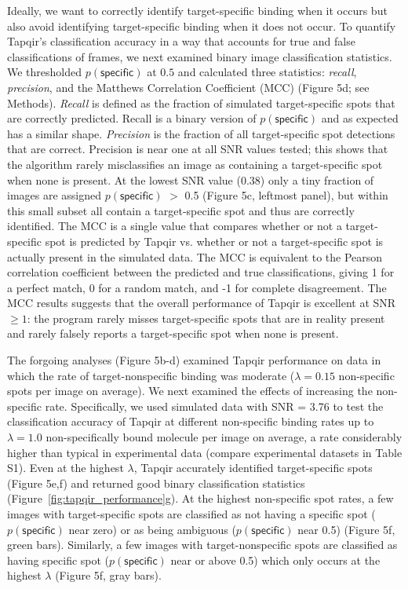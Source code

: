 Ideally, we want to correctly identify target-specific binding when it occurs but also avoid identifying target-specific binding when it does not occur. To quantify Tapqir's classification accuracy in a way that accounts for true and false classifications of frames, we next examined binary image classification statistics. We thresholded $p(\mathsf{specific})$ at $0.5$ and calculated three statistics: \textit{recall}, \textit{precision}, and the Matthews Correlation Coefficient (MCC) \cite{Matthews1975-rw} (Figure 5d; see Methods). \textit{Recall} is defined as the fraction of simulated target-specific spots that are correctly predicted. Recall is a binary version of $p(\mathsf{specific})$ and as expected has a similar shape. \textit{Precision} is the fraction of all target-specific spot detections that are correct. Precision is near one at all SNR values tested; this shows that the algorithm rarely misclassifies an image as containing a target-specific spot when none is present. At the lowest SNR value (0.38) only a tiny fraction of images are assigned $p(\mathsf{specific})$ $>$ 0.5 (Figure 5c, leftmost panel), but within this small subset all contain a target-specific spot and thus are correctly identified. The MCC is a single value that compares whether or not a target-specific spot is predicted by Tapqir vs. whether or not a target-specific spot is actually present in the simulated data.  The MCC is equivalent to the Pearson correlation coefficient between the predicted and true classifications, giving 1 for a perfect match, 0 for a random match, and -1 for complete disagreement. The MCC results suggests that the overall performance of Tapqir is excellent at SNR $\ge 1$: the program rarely misses target-specific spots that are in reality present and rarely falsely reports a target-specific spot when none is present.  

The forgoing analyses (Figure 5b-d) examined Tapqir performance on data in which the rate of target-nonspecific binding was moderate ($\lambda  = 0.15$ non-specific spots per image on average).  We next examined the effects of increasing the non-specific rate.  Specifically, we used  simulated data with SNR = 3.76 to test the classification accuracy of Tapqir at different non-specific binding rates up to $\lambda  = 1.0$ non-specifically bound molecule per image on average, a rate considerably higher than typical in experimental data (compare experimental datasets in Table S1).  Even at the highest $\lambda$,  Tapqir accurately identified target-specific spots (Figure 5e,f) and returned good binary classification statistics (Figure~\ref{fig:tapqir_performance}g).  At the highest non-specific spot rates, a few images with target-specific spots are classified as not having a specific spot ($p(\mathsf{specific})$ near zero) or as being ambiguous ($p(\mathsf{specific})$ near 0.5) (Figure 5f, green bars). Similarly, a few images with target-nonspecific spots are classified as having specific spot ($p(\mathsf{specific})$ near or above 0.5) which only occurs at the highest $\lambda$ (Figure 5f, gray bars).

